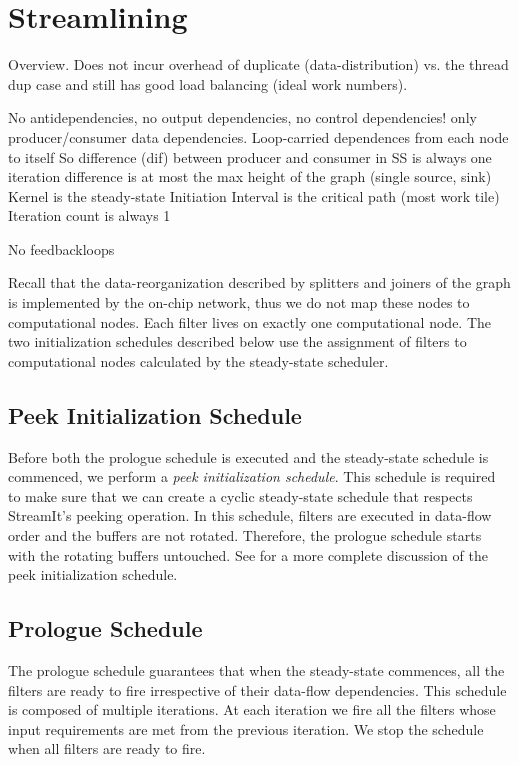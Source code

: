 \section{Streamlining}
Overview.
Does not incur overhead of duplicate (data-distribution) vs. the
thread dup case and still has good load balancing (ideal work numbers).


No antidependencies, no output dependencies, no control dependencies!
only producer/consumer data dependencies.
Loop-carried dependences from each node to itself
So difference (dif) between producer and consumer in SS is always one
iteration difference is at most the max height of the graph 
(single source, sink)
Kernel is the steady-state
Initiation Interval is the critical path (most work tile)
Iteration count is always 1

No feedbackloops


Recall that the data-reorganization described by splitters and joiners
of the graph is implemented by the on-chip network, thus we do not map
these nodes to computational nodes.  Each filter lives on exactly one
computational node.  The two initialization schedules described below
use the assignment of filters to computational nodes calculated by the
steady-state scheduler.

\subsection{Peek Initialization Schedule}
Before both the prologue schedule is executed and the steady-state
schedule is commenced, we perform a {\it peek initialization
schedule}.  This schedule is required to make sure that we can create
a cyclic steady-state schedule that respects StreamIt's peeking
operation.  In this schedule, filters are executed in data-flow order
and the buffers are not rotated.  Therefore, the prologue schedule
starts with the rotating buffers untouched.  See
\cite{streamitcc} for a more complete discussion of the peek
initialization schedule.

\subsection{Prologue Schedule}
The prologue schedule guarantees that when the steady-state commences,
all the filters are ready to fire irrespective of their data-flow
dependencies.  This schedule is composed of multiple iterations.  At
each iteration we fire all the filters whose input requirements are met
from the previous iteration.  We stop the schedule when all filters are
ready to fire.